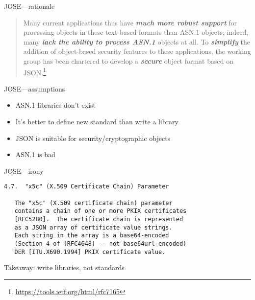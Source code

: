 \documentclass[ignorenonframetext,aspectratio=43]{beamer}
\providecommand{\tightlist}{%
  \setlength{\itemsep}{0pt}\setlength{\parskip}{0pt}}
\begin{document}
\begin{frame}{JOSE---rationale}
\begin{quotation}
\Large
  Many current applications thus have {\bf \em much more robust support} for
  processing objects in these text-based formats than ASN.1 objects;
  indeed, many {\bf \em lack the ability to process ASN.1} objects at all.  To
  {\bf \em simplify} the addition of object-based security features to these
  applications, the %
  working group has been chartered to develop a {\bf \em secure} object format
  based on JSON.\footnote[frame]{
    \url{https://tools.ietf.org/html/rfc7165}}
\end{quotation}
\end{frame}


\begin{frame}{JOSE---assumptions}
\begin{itemize}
\tightlist
\item ASN.1 libraries don't exist
\item It's better to define new standard than write a library
\item JSON is suitable for security/cryptographic objects
\item ASN.1 is bad
\end{itemize}
\end{frame}

\begin{frame}[fragile]{JOSE---irony}
\begin{verbatim}
4.7.  "x5c" (X.509 Certificate Chain) Parameter

   The "x5c" (X.509 certificate chain) parameter
   contains a chain of one or more PKIX certificates
   [RFC5280].  The certificate chain is represented
   as a JSON array of certificate value strings.
   Each string in the array is a base64-encoded
   (Section 4 of [RFC4648] -- not base64url-encoded)
   DER [ITU.X690.1994] PKIX certificate value.
\end{verbatim}
\end{frame}



\begin{frame}[plain]
\huge
Takeaway: write libraries, not standards
\end{frame}
\end{document}
